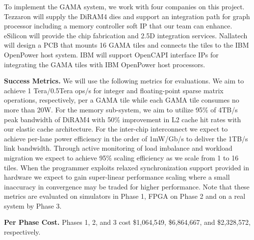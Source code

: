 

To implement the GAMA system, %
we work with four companies on this project. 
Tezzaron will supply the DiRAM4 dies and support an integration path for graph processor including a memory controller soft IP that our team can enhance.
eSilicon will provide the chip fabrication and 2.5D integration services.
Nallatech will design a PCB that mounts 16 GAMA tiles and connects the tiles to the IBM OpenPower host system. %
IBM will support OpenCAPI interface IPs for integrating the GAMA tiles with IBM OpenPower host processors. 

\vspace{3pt}
\noindent
\textbf{Success Metrics.} 
We will use the following metrics for evaluations.
We aim to achieve 1 Tera/0.5Tera ops/s for integer and floating-point sparse matrix operations, respectively, per a GAMA tile while each GAMA tile consumes no more than 20W.
For the memory sub-system, we aim to utilize 95\% of 4TB/s peak bandwidth of DiRAM4 with 50\% improvement in L2 cache hit rates with our elastic cache architecture.
For the inter-chip interconnect we expect to achieve per-lane power efficiency in the order of 1mW/Gb/s to deliver the 1TB/s link bandwidth. %
Through active monitoring of load imbalance and workload migration we expect to achieve 95\% scaling efficiency as we scale from 1 to 16 tiles. 
When the programmer exploits relaxed synchronization support provided in hardware  we expect to gain super-linear performance scaling where a small inaccuracy in convergence may be traded for higher performance.  
Note that these metrics are evaluated on simulators in Phase 1, FPGA on Phase 2 and on a real system by Phase 3.  


\vspace{3pt}
\noindent
\textbf{Per Phase Cost.} 
Phases 1, 2, and 3 cost \$1,064,549, \$6,864,667, and \$2,328,572, respectively.

